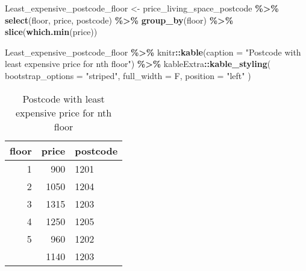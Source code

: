 \documentclass[
]{article}
\newenvironment{Shaded}{\begin{snugshade}}{\end{snugshade}}
\newcommand{\AttributeTok}[1]{\textcolor[rgb]{0.13,0.29,0.53}{#1}}
\newcommand{\FunctionTok}[1]{\textcolor[rgb]{0.13,0.29,0.53}{\textbf{#1}}}
\newcommand{\NormalTok}[1]{#1}
\newcommand{\OtherTok}[1]{\textcolor[rgb]{0.56,0.35,0.01}{#1}}
\newcommand{\SpecialCharTok}[1]{\textcolor[rgb]{0.81,0.36,0.00}{\textbf{#1}}}
\newcommand{\StringTok}[1]{\textcolor[rgb]{0.31,0.60,0.02}{#1}}
\begin{document}
\begin{Shaded}
\begin{Highlighting}[]
\NormalTok{Least\_expensive\_postcode\_floor }\OtherTok{\textless{}{-}}\NormalTok{ price\_living\_space\_postcode }\SpecialCharTok{\%\textgreater{}\%}
  \FunctionTok{select}\NormalTok{(floor, price, postcode) }\SpecialCharTok{\%\textgreater{}\%}
  \FunctionTok{group\_by}\NormalTok{(floor) }\SpecialCharTok{\%\textgreater{}\%}
  \FunctionTok{slice}\NormalTok{(}\FunctionTok{which.min}\NormalTok{(price))}

\NormalTok{Least\_expensive\_postcode\_floor }\SpecialCharTok{\%\textgreater{}\%}
\NormalTok{  knitr}\SpecialCharTok{::}\FunctionTok{kable}\NormalTok{(}\AttributeTok{caption =} \StringTok{"Postcode with least expensive price for nth floor"}\NormalTok{) }\SpecialCharTok{\%\textgreater{}\%}
\NormalTok{  kableExtra}\SpecialCharTok{::}\FunctionTok{kable\_styling}\NormalTok{(}
    \AttributeTok{bootstrap\_options =} \StringTok{"striped"}\NormalTok{,}
    \AttributeTok{full\_width =}\NormalTok{ F,}
    \AttributeTok{position =} \StringTok{"left"}
\NormalTok{  )}
\end{Highlighting}
\end{Shaded}

\begin{longtable}[l]{rrl}
\caption{\label{tab:unnamed-chunk-4}Postcode with least expensive price for nth floor}\\
\toprule
floor & price & postcode\\
\midrule
1 & 900 & 1201\\
2 & 1050 & 1204\\
3 & 1315 & 1203\\
4 & 1250 & 1205\\
5 & 960 & 1202\\
\addlinespace
6 & 1140 & 1203\\
\bottomrule
\end{longtable}
\end{document}
